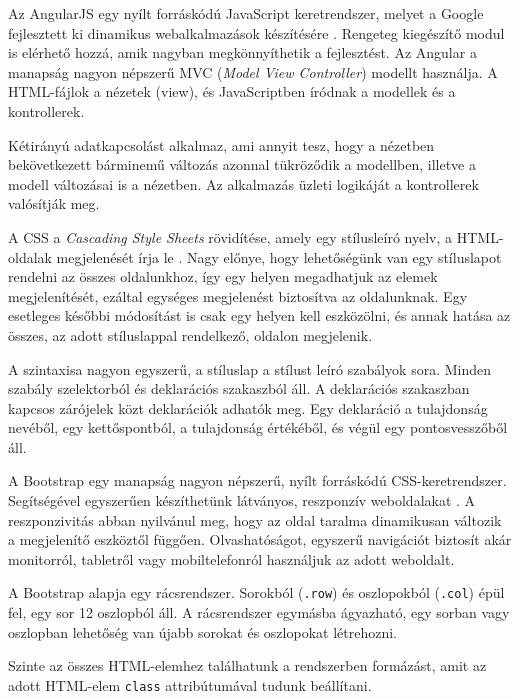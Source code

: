 
Az AngularJS egy nyílt forráskódú JavaScript keretrendszer, melyet a Google fejlesztett ki dinamikus webalkalmazások készítésére \cite{angularjs}. Rengeteg kiegészítő modul is elérhető hozzá, amik nagyban megkönnyíthetik a fejlesztést. Az Angular a manapság nagyon népszerű MVC (\textit{Model View Controller}) modellt használja. A HTML-fájlok a nézetek (view), és JavaScriptben íródnak a modellek és a kontrollerek.

Kétirányú adatkapcsolást alkalmaz, ami annyit tesz, hogy a nézetben bekövetkezett bárminemű változás azonnal tükröződik a modellben, illetve a modell változásai is a nézetben. Az alkalmazás üzleti logikáját a kontrollerek valósítják meg.


A CSS a \textit{Cascading Style Sheets} rövidítése, amely egy stílusleíró nyelv, a HTML-oldalak megjelenését írja le \cite{css}. Nagy előnye, hogy lehetőségünk van egy stíluslapot rendelni az összes oldalunkhoz, így egy helyen megadhatjuk az elemek megjelenítését, ezáltal egységes megjelenést biztosítva az oldalunknak. Egy esetleges későbbi módosítást is csak egy helyen kell eszközölni, és annak hatása az összes, az adott stíluslappal rendelkező, oldalon megjelenik.

A szintaxisa nagyon egyszerű, a stíluslap a stílust leíró szabályok sora. Minden szabály szelektorból és deklarációs szakaszból áll. A deklarációs szakaszban kapcsos zárójelek közt deklarációk adhatók meg. Egy deklaráció a tulajdonság nevéből, egy kettőspontból, a tulajdonság értékéből, és végül egy pontosvesszőből áll.


A Bootstrap egy manapság nagyon népszerű, nyílt forráskódú CSS-keretrendszer. Segítségével egyszerűen készíthetünk látványos, reszponzív weboldalakat \cite{bootstrap}. A reszponzivitás abban nyilvánul meg, hogy az oldal taralma dinamikusan változik a megjelenítő eszköztől függően. Olvashatóságot, egyszerű navigációt biztosít akár monitorról, tabletről vagy mobiltelefonról használjuk az adott weboldalt.

A Bootstrap alapja egy rácsrendszer. Sorokból (\texttt{.row}) és oszlopokból (\texttt{.col}) épül fel, egy sor 12 oszlopból áll. A rácsrendszer egymásba ágyazható, egy sorban vagy oszlopban lehetőség van újabb sorokat és oszlopokat létrehozni.

Szinte az összes HTML-elemhez találhatunk a rendszerben formázást, amit az adott HTML-elem \texttt{class} attribútumával tudunk beállítani.

